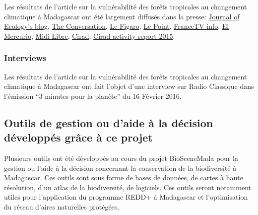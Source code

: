 \documentclass[12pt,]{article}
\begin{document}
Les résultats de l'article sur la vulnérabilité des forêts tropicales au
changement climatique à Madagascar ont été largement diffusés dans la
presse:
\href{https://jecologyblog.wordpress.com/2016/05/06/editors-choice-1043/}{Journal
of Ecology's blog}, \href{https://t.co/pMXLUUrV0I}{The Conversation},
\href{https://ghislainv.github.io/images/media/Figaro-16-02-2016.png}{Le
Figaro},
\href{http://www.lepoint.fr/environnement/le-rechauffement-climatique-risque-d-empecher-les-forets-tropicales-de-stocker-le-carbone-12-02-2016-2017587_1927.php\#xtor=RSS-221}{Le
Point},
\href{http://www.francetvinfo.fr/monde/environnement/le-rechauffement-climatique-risque-d-empecher-les-forets-tropicales-de-stocker-le-carbone_1312341.html\#xtor=AL-54-\%5Barticle\%5D}{FranceTV
info},
\href{http://www.emol.com/noticias/Tecnologia/2016/02/12/788109/Estudio-asegura-que-cambio-climatico-amenaza-la-absorcion-de-CO2-por-bosques-tropicales.html}{El
Mercurio},
\href{https://ghislainv.github.io//images/media/MidiLibre-16-02-2016.png}{Midi-Libre},
\href{http://www.cirad.fr/en/news/all-news-items/press-releases/2016/climate-change-alters-the-co2-storage-capacity-of-tropical-forests}{Cirad},
\href{https://www.cirad.fr/content/download/11005/128917/version/3/file/RA2015_FR.pdf}{Cirad
activity report 2015}.

\hypertarget{interviews}{%
\subsubsection{Interviews}\label{interviews}}

Les résultats de l'article sur la vulnérabilité des forêts tropicales au
changement climatique à Madagascar ont fait l'objet d'une interview sur
Radio Classique dans l'émission ``3 minutes pour la planète'' du 16
Février 2016.

\hypertarget{outils-de-gestion-ou-daide-a-la-decision-developpes-grace-a-ce-projet}{%
\subsection{Outils de gestion ou d'aide à la décision développés grâce à
ce
projet}\label{outils-de-gestion-ou-daide-a-la-decision-developpes-grace-a-ce-projet}}

Plusieurs outils ont été développés au cours du projet BioSceneMada pour
la gestion ou l'aide à la décision concernant la conservation de la
biodiversité à Madagascar. Ces outils sont sous forme de bases de
données, de cartes à haute résolution, d'un atlas de la biodiversité, de
logiciels. Ces outils seront notamment utiles pour l'application du
programme REDD+ à Madagascar et l'optimisation du réseau d'aires
naturelles protégées.
\end{document}
